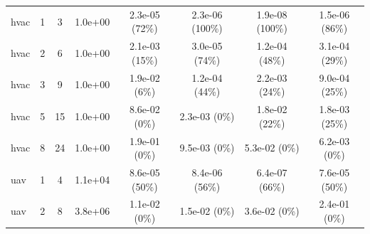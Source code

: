 \begin{table}[htbp]
{\begin{tabular}{@{}lccccccc@{}}
\midrule
hvac & 1 & 3 & 1.0e+00 & 2.3e-05 (72\%) & 2.3e-06 (100\%) & 1.9e-08 (100\%) & 1.5e-06 (86\%) \\
hvac & 2 & 6 & 1.0e+00 & 2.1e-03 (15\%) & 3.0e-05 (74\%) & 1.2e-04 (48\%) & 3.1e-04 (29\%) \\
hvac & 3 & 9 & 1.0e+00 & 1.9e-02 (6\%) & 1.2e-04 (44\%) & 2.2e-03 (24\%) & 9.0e-04 (25\%) \\
hvac & 5 & 15 & 1.0e+00 & 8.6e-02 (0\%) & 2.3e-03 (0\%) & 1.8e-02 (22\%) & 1.8e-03 (25\%) \\
hvac & 8 & 24 & 1.0e+00 & 1.9e-01 (0\%) & 9.5e-03 (0\%) & 5.3e-02 (0\%) & 6.2e-03 (0\%) \\
\midrule
uav & 1 & 4 & 1.1e+04 & 8.6e-05 (50\%) & 8.4e-06 (56\%) & 6.4e-07 (66\%) & 7.6e-05 (50\%) \\
uav & 2 & 8 & 3.8e+06 & 1.1e-02 (0\%) & 1.5e-02 (0\%) & 3.6e-02 (0\%) & 2.4e-01 (0\%) \\
\bottomrule
\end{tabular}}
\end{table}
